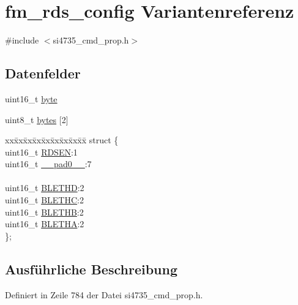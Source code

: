 \hypertarget{unionfm__rds__config}{}\section{fm\+\_\+rds\+\_\+config Variantenreferenz}
\label{unionfm__rds__config}


{\ttfamily \#include $<$si4735\+\_\+cmd\+\_\+prop.\+h$>$}

\subsection*{Datenfelder}
\begin{DoxyCompactItemize}
\item 
uint16\+\_\+t \hyperlink{unionfm__rds__config_ab0549c1b5ea980a02e7eab77e21fea49}{byte}
\item 
uint8\+\_\+t \hyperlink{unionfm__rds__config_a46e4c05d20a047ec169f60d3167e912e}{bytes} \mbox{[}2\mbox{]}
\item 
\begin{tabbing}
xx\=xx\=xx\=xx\=xx\=xx\=xx\=xx\=xx\=\kill
struct \{\\
\>uint16\_t \hyperlink{unionfm__rds__config_ad71a7ca46176641616c4938efc2778ed}{RDSEN}:1\\
\>uint16\_t \hyperlink{unionfm__rds__config_a77132c2c26a75f5b8751b235cda23828}{\_\_pad0\_\_}:7\\
\>\\
\>uint16\_t \hyperlink{unionfm__rds__config_aa256d0f762bc9c1ba9fd6f9ee0047d4e}{BLETHD}:2\\
\>uint16\_t \hyperlink{unionfm__rds__config_a19e09ee442964285a5affbdbe4d59795}{BLETHC}:2\\
\>uint16\_t \hyperlink{unionfm__rds__config_a951c1641c0b68c6ef55eab7f22e5d2f4}{BLETHB}:2\\
\>uint16\_t \hyperlink{unionfm__rds__config_ae061939e6d3519d4b231b9da2cab30e9}{BLETHA}:2\\
\}; \\

\end{tabbing}\end{DoxyCompactItemize}


\subsection{Ausführliche Beschreibung}


Definiert in Zeile 784 der Datei si4735\+\_\+cmd\+\_\+prop.\+h.



